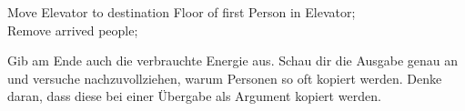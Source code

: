 \begin{enumerate}
\begin{algorithm}[H]
{   {
    Move Elevator to destination Floor of first Person in Elevator; \\
    Remove arrived people; \\
  }
 }
\end{algorithm}

Gib am Ende auch die verbrauchte Energie aus.
Schau dir die Ausgabe genau an und versuche nachzuvollziehen, warum Personen so oft kopiert werden.
Denke daran, dass diese bei einer Übergabe als Argument kopiert werden.
\end{enumerate}


